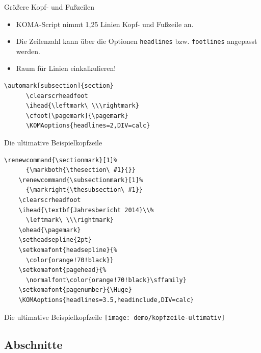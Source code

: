 \begin{Frame}[fragile]{Größere Kopf- und Fußzeilen}
  \begin{itemize}
    \item KOMA-Script nimmt 1,25 Linien Kopf- und Fußzeile an.
    \item Die Zeilenzahl kann über die Optionen \lstinline-headlines-
      bzw. \lstinline-footlines- angepasst werden.
    \item Raum für Linien einkalkulieren!
  \end{itemize}

  \xxx

  \begin{Beispiel}
    \begin{lstlisting}[gobble=6,style=block]
      \automark[subsection]{section}
      \clearscrheadfoot
      \ihead{\leftmark\ \\\rightmark}
      \cfoot[\pagemark]{\pagemark}
      \KOMAoptions{headlines=2,DIV=calc}
    \end{lstlisting}
  \end{Beispiel}
\end{Frame}

\begin{Frame}[fragile]{Die ultimative Beispielkopfzeile}
  \begin{lstlisting}[gobble=4]
    \renewcommand{\sectionmark}[1]%
      {\markboth{\thesection\ #1}{}}
    \renewcommand{\subsectionmark}[1]%
      {\markright{\thesubsection\ #1}}
    \clearscrheadfoot
    \ihead{\textbf{Jahresbericht 2014}\\%
      \leftmark\ \\\rightmark}
    \ohead{\pagemark}
    \setheadsepline{2pt}
    \setkomafont{headsepline}{%
      \color{orange!70!black}}
    \setkomafont{pagehead}{%
      \normalfont\color{orange!70!black}\sffamily}
    \setkomafont{pagenumber}{\Huge}
    \KOMAoptions{headlines=3.5,headinclude,DIV=calc}
  \end{lstlisting}
\end{Frame}

\begin{Frame}{Die ultimative Beispielkopfzeile}
  \texttt{[image: demo/kopfzeile-ultimativ]}
\end{Frame}

\subsection{Abschnitte}

